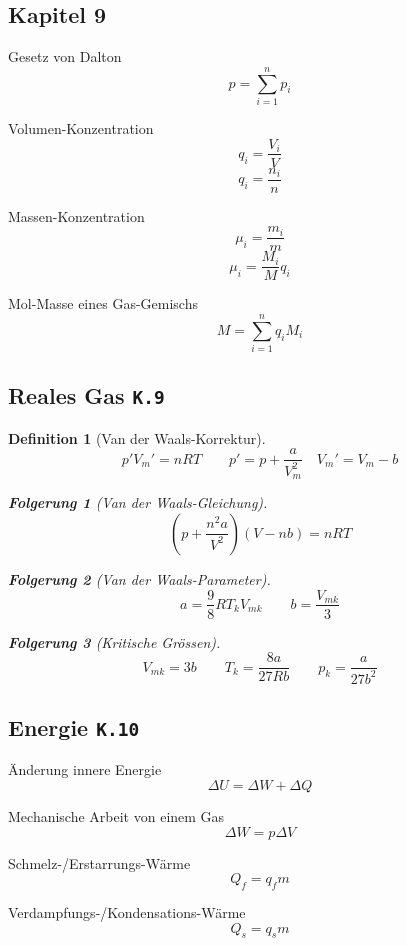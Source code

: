 \documentclass[a4paper, twocolumn]{article}
\numberwithin{equation}{section}
\theoremstyle{hsr-def}
\newtheorem{definition}{Definition}[section]
\theoremstyle{hsr-sub}
\newtheorem{result}{Folgerung}[definition]
\newcommand{\fromlecture}[1]{\textcolor{red!70!black}{\small\texttt{K.#1}}}
\begin{document}
\subsection*{Kapitel 9}
Gesetz von Dalton
\[
    p = \sum_{i = 1}^n p_i
\]

Volumen-Konzentration
\[
    q_i = \frac{V_i}{V}
\]
\[
    q_i = \frac{n_i}{n}
\]

Massen-Konzentration
\[
    \mu_i = \frac{m_i}{m}
\]
\[
    \mu_i = \frac{M_i}{M} q_i
\]

Mol-Masse eines Gas-Gemischs
\[
    M = \sum_{i = 1}^n q_i M_i
\]

\subsection{Reales Gas \fromlecture{9}}
\begin{definition}[Van der Waals-Korrektur]
\[
    p'V_m' = nRT
    \qquad
    p' = p + \frac{a}{V_m^2}
    \quad
    V_m' = V_m - b
\]

\begin{result}[Van der Waals-Gleichung]
\[
    \left(p + \frac{n^2 a}{V^2} \right)(V - nb) = nRT
\]
\end{result}

\begin{result}[Van der Waals-Parameter]
\[
    a = \frac{9}{8} R T_k V_{mk}
    \qquad
    b = \frac{V_{mk}}{3}
\]
\end{result}

\begin{result}[Kritische Gr\"ossen]
\[
    V_{mk} = 3b
    \qquad
    T_k = \frac{8a}{27Rb}
    \qquad
    p_k = \frac{a}{27b^2}
\]
\end{result}
\end{definition}


\begin{figure}[h] \centering
    
\end{figure}

\subsection{Energie \fromlecture{10}}
\"Anderung innere Energie
\[
    \Delta U = \Delta W + \Delta Q
\]

Mechanische Arbeit von einem Gas
\[
    \Delta W = p \Delta V
\]

Schmelz-/Erstarrungs-W\"arme
\[
    Q_f = q_f m
\]

Verdampfungs-/Kondensations-W\"arme
\[
    Q_s = q_s m
\]
\end{document}

